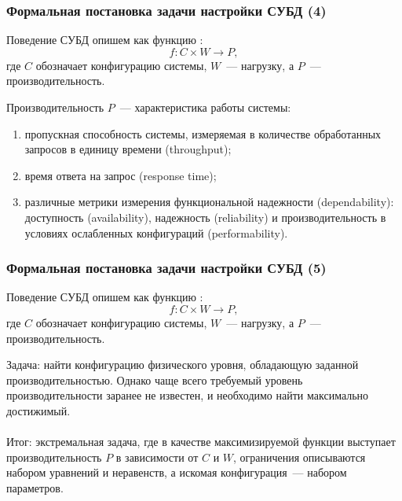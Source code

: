 \documentclass[unicode]{beamer}
\begin{document}
\begin{frame}
\frametitle{Формальная постановка задачи настройки СУБД (4)}

\begin{block}{Поведение СУБД опишем как функцию \cite{p4}:}
$$f: C \times W \rightarrow P,$$
 где $C$ обозначает конфигурацию системы, $W$~--- нагрузку, а $P$~--- производительность. 
\end{block}

Производительность $P$~--- характеристика работы системы: 

\begin{enumerate}
  \item пропускная способность системы, измеряемая в количестве обработанных запросов в единицу времени (throughput);
  \item время ответа на запрос (response time);
  \item различные метрики измерения функциональной надежности (dependability):  доступность (availability), надежность (reliability) и производительность в условиях ослабленных конфигураций (performability).
\end{enumerate}

\end{frame}

\begin{frame}
\frametitle{Формальная постановка задачи настройки СУБД (5)}

\begin{block}{Поведение СУБД опишем как функцию \cite{p4}:}
$$f: C \times W \rightarrow P,$$
 где $C$ обозначает конфигурацию системы, $W$~--- нагрузку, а $P$~--- производительность. 
\end{block}

Задача: найти конфигурацию физического уровня, обладающую заданной производительностью. Однако чаще всего требуемый уровень производительности заранее не известен, и необходимо найти максимально достижимый. 
\\~\\
\alert{Итог: экстремальная задача, где в качестве максимизируемой функции выступает производительность $P$ в зависимости от $C$ и $W$, ограничения описываются набором уравнений и неравенств, а искомая конфигурация~--- набором параметров.}

\end{frame}
\end{document}
